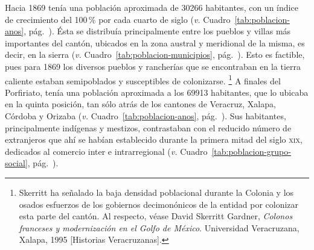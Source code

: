 \documentclass[14pt,twoside,final]{extbook} %
\let\oldfootnote\footnote
\renewcommand\footnote[1]{%
\oldfootnote{\hspace{1mm}#1}}
\begin{document}
Hacia 1869 tenía una población aproximada de 30266 habitantes, con un índice de crecimiento del 100\,\% por cada cuarto de siglo (\emph{v.} Cuadro~\ref{tab:poblacion-anos}, pág.~\pageref{tab:poblacion-anos}). Ésta se distribuía principalmente entre los pueblos y villas más importantes del cantón, ubicados en la zona austral y meridional de la misma, es decir, en la sierra (\emph{v.} Cuadro~\ref{tab:poblacion-municipios}, pág.~\pageref{tab:poblacion-municipios}). Esto es factible, pues para 1869 los diversos pueblos y rancherías que se encontraban en la tierra caliente estaban semipoblados y susceptibles de colonizarse.\footnote{Skerritt ha señalado la baja densidad poblacional durante la Colonia y los osados esfuerzos de los gobiernos decimonónicos de la entidad por colonizar esta parte del cantón. Al respecto, véase David Skerritt Gardner, \emph{Colonos franceses y modernización en el Golfo de México}. Universidad Veracruzana, Xalapa, 1995 [Historias Veracruzanas].} A finales del Porfiriato, tenía una población aproximada a los 69913 habitantes, que lo ubicaba en la quinta posición, tan sólo atrás de los cantones de Veracruz, Xalapa, Córdoba y Orizaba (\emph{v.} Cuadro~\ref{tab:poblacion-anos}, pág.~\pageref{tab:poblacion-anos}). Sus habitantes, principalmente indígenas y mestizos, contrastaban con el reducido número de extranjeros que ahí se habían establecido durante la primera mitad del siglo \textsc{xix}, dedicados al comercio inter e intrarregional (\emph{v.} Cuadro~\ref{tab:poblacion-grupo-social}, pág.~\pageref{tab:poblacion-grupo-social}).
\end{document}
